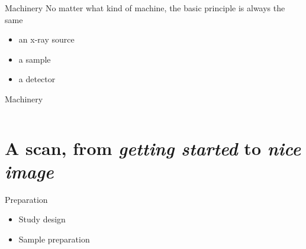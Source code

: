 \begin{frame}[label=current]{Machinery}
No matter what kind of machine, the basic principle is always the same
\begin{itemize}
	\item an x-ray source
	\item a sample
	\item a detector
\end{itemize}
\end{frame}

\begin{frame}[label=current]{Machinery}
	\begin{columns}
		\begin{column}{0.49\linewidth}
			\centering
			
		\end{column}
		\begin{column}{0.49\linewidth}
			\centering
			
		\end{column}
	\end{columns}
\end{frame}


\section{A scan, from \emph{getting started} to \emph{nice image}}
\begin{frame}{Preparation}
	\begin{itemize}
		\item Study design
		\item Sample preparation
	\end{itemize}
\end{frame}

